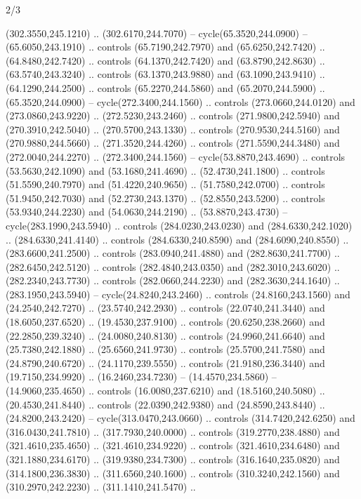 \begin{flagdescription}{2/3}
\begin{scope}[xshift=0.5\flaglength,yshift=0.5\flagwidth,scale=\stretchfactor]
\begin{scope}[scale=0.001645\flagwidth,yshift=65mm,xshift=-63mm]
\begin{scope}[y=0.80pt, x=0.80pt, yscale=-1,]
\begin{scope}[cm={{1.33333,0.0,0.0,1.33333,(0.0,1e-05)}}]
  (302.3550,245.1210) .. (302.6170,244.7070) -- cycle(65.3520,244.0900) --
  (65.6050,243.1910) .. controls (65.7190,242.7970) and (65.6250,242.7420) ..
  (64.8480,242.7420) .. controls (64.1370,242.7420) and (63.8790,242.8630) ..
  (63.5740,243.3240) .. controls (63.1370,243.9880) and (63.1090,243.9410) ..
  (64.1290,244.2500) .. controls (65.2270,244.5860) and (65.2070,244.5900) ..
  (65.3520,244.0900) -- cycle(272.3400,244.1560) .. controls (273.0660,244.0120)
  and (273.0860,243.9220) .. (272.5230,243.2460) .. controls (271.9800,242.5940)
  and (270.3910,242.5040) .. (270.5700,243.1330) .. controls (270.9530,244.5160)
  and (270.9880,244.5660) .. (271.3520,244.4260) .. controls (271.5590,244.3480)
  and (272.0040,244.2270) .. (272.3400,244.1560) -- cycle(53.8870,243.4690) ..
  controls (53.5630,242.1090) and (53.1680,241.4690) .. (52.4730,241.1800) ..
  controls (51.5590,240.7970) and (51.4220,240.9650) .. (51.7580,242.0700) ..
  controls (51.9450,242.7030) and (52.2730,243.1370) .. (52.8550,243.5200) ..
  controls (53.9340,244.2230) and (54.0630,244.2190) .. (53.8870,243.4730) --
  cycle(283.1990,243.5940) .. controls (284.0230,243.0230) and
  (284.6330,242.1020) .. (284.6330,241.4140) .. controls (284.6330,240.8590) and
  (284.6090,240.8550) .. (283.6600,241.2500) .. controls (283.0940,241.4880) and
  (282.8630,241.7700) .. (282.6450,242.5120) .. controls (282.4840,243.0350) and
  (282.3010,243.6020) .. (282.2340,243.7730) .. controls (282.0660,244.2230) and
  (282.3630,244.1640) .. (283.1950,243.5940) -- cycle(24.8240,243.2460) ..
  controls (24.8160,243.1560) and (24.2540,242.7270) .. (23.5740,242.2930) ..
  controls (22.0740,241.3440) and (18.6050,237.6520) .. (19.4530,237.9100) ..
  controls (20.6250,238.2660) and (22.2850,239.3240) .. (24.0080,240.8130) ..
  controls (24.9960,241.6640) and (25.7380,242.1880) .. (25.6560,241.9730) ..
  controls (25.5700,241.7580) and (24.8790,240.6720) .. (24.1170,239.5550) ..
  controls (21.9180,236.3440) and (19.7150,234.9920) .. (16.2460,234.7230) --
  (14.4570,234.5860) -- (14.9060,235.4650) .. controls (16.0080,237.6210) and
  (18.5160,240.5080) .. (20.4530,241.8440) .. controls (22.0390,242.9380) and
  (24.8590,243.8440) .. (24.8200,243.2420) -- cycle(313.0470,243.0660) ..
  controls (314.7420,242.6250) and (316.0430,241.7810) .. (317.7930,240.0000) ..
  controls (319.2770,238.4880) and (321.4610,235.4650) .. (321.4610,234.9220) ..
  controls (321.4610,234.6480) and (321.1880,234.6170) .. (319.9380,234.7300) ..
  controls (316.1640,235.0820) and (314.1800,236.3830) .. (311.6560,240.1600) ..
  controls (310.3240,242.1560) and (310.2970,242.2230) .. (311.1410,241.5470) ..

\end{scope}
\end{scope}
\end{scope}
\end{scope}
\end{flagdescription}
